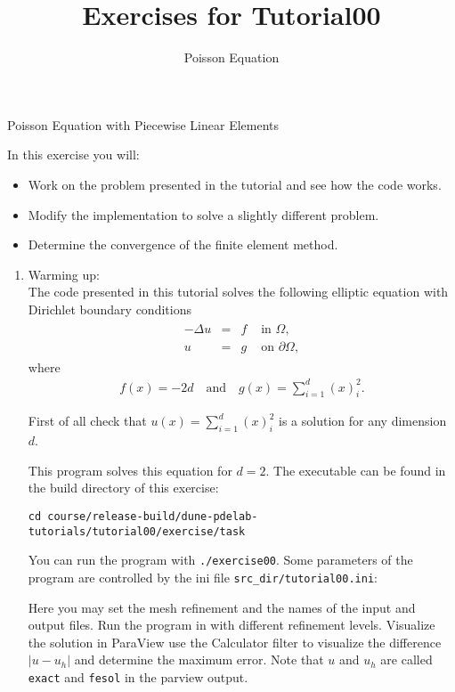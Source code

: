 \documentclass[12pt,a4paper]{article}
\title{\textbf{Exercises for Tutorial00}}
\subtitle{Poisson Equation}
\newcommand{\Laplace}{\Delta}
\begin{document}
\exerciseheader

\begin{Exercise}{Poisson Equation with Piecewise Linear Elements}

In this exercise you will:
\begin{itemize}
\item Work on the problem presented in the tutorial and see how the
  code works.
\item Modify the implementation to solve a slightly different problem.
\item Determine the convergence of the finite element method.
\end{itemize}

\begin{enumerate}
\item {\sc Warming up}:\\
  The code presented in this tutorial solves the following elliptic
  equation with Dirichlet boundary conditions
  \begin{align*}
    \begin{array}{rcll}
      -\Laplace u  & = & f & \text{ in } \Omega, \\
      u & = & g & \text{ on } \partial\Omega,
    \end{array}
  \end{align*}
  where
  \begin{align*}
    f(x) = -2d \quad\text{and}\quad  g(x) = \sum_{i=1}^d (x)_i^2.
  \end{align*}

  First of all check that $u(x) = \sum_{i=1}^d (x)_i^2$ is a solution
  for any dimension $d$.

  This program solves this equation for $d=2$. The executable can be
  found in the build directory of this exercise:
  \begin{lstlisting}
cd course/release-build/dune-pdelab-tutorials/tutorial00/exercise/task
  \end{lstlisting}
  You can run the program with \lstinline{./exercise00}.  Some
  parameters of the program are controlled by the ini file
  \lstinline{src_dir/tutorial00.ini}:
  

  Here you may set the mesh refinement and the names of the input and
  output files. Run the program in with different refinement
  levels. Visualize the solution in ParaView use the Calculator filter
  to visualize the difference $|u-u_h|$ and determine the maximum
  error. Note that $u$ and $u_h$ are called \lstinline{exact} and
  \lstinline{fesol} in the parview output.


\end{enumerate}
\end{Exercise}
\end{document}
